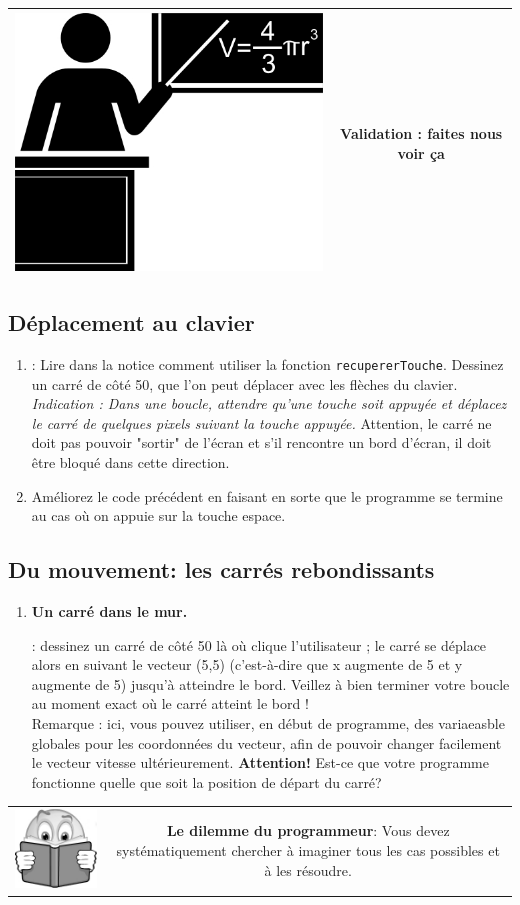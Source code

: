 \documentclass[11pt,a4paper]{article}
\newcommand{\checkbox}{$\square$ \smallskip}
\newenvironment{lecture}{%
\smallskip
\begin{tabular}{c|c}
    \hspace{.03\textwidth} \includegraphics[width=.07\textwidth]{img/lecture.jpg} & 
\begin{minipage}{.85\textwidth}
}{%
\end{minipage}
\end{tabular}
}
\newcounter{exo} \setcounter{exo}{0}
\newenvironment{action}{%
    \begin{enumerate}[\numerotation] \addtocounter{exo}{-1}%
        }{%
    \end{enumerate}
}
\newcommand{\numexoa}{\theexo \addtocounter{exo}{1}}
\newcommand{\numerotation}{\checkbox \smallskip \numexoa.}
\newenvironment{validation}{%
\smallskip
\begin{tabular}{c|c}
    \hspace{.03\textwidth} \includegraphics[width=.07\textwidth]{img/teacher.jpg} & 
\begin{minipage}{.85\textwidth}
}{%
\end{minipage}\\
\hline
\end{tabular}
}
\newcounter{exoo} \setcounter{exoo}{0}
\newcommand{\numexo}{\theexoo}
\newcommand{\repexo}{{\tt exo_\numexo}}
\newcommand{\exoplus}{\addtocounter{exoo}{1}}
\begin{document}
\begin{validation}
    Validation : faites nous voir ça 
\end{validation}
\bigskip

\subsection*{Déplacement au clavier}
\begin{action}
\item \exoplus \repexo : Lire dans la notice comment utiliser la fonction {\tt recupererTouche}. Dessinez un carré de côté 50, que l'on peut déplacer avec les flèches du clavier. \emph{Indication : Dans une boucle, attendre qu'une touche soit appuyée et déplacez le carré de quelques pixels suivant la touche appuyée.} Attention, le carré ne doit pas pouvoir "sortir" de l'écran et s'il rencontre un bord d'écran, il doit être bloqué dans cette direction.
\item Améliorez le code précédent en faisant en sorte que le programme se termine au cas où on appuie sur la touche espace.
\end{action}

\newpage
\subsection*{Du mouvement: les carrés rebondissants}
\begin{action}
\item {\bf Un carré dans le mur.} \exoplus \repexo : dessinez un carré de côté 50 là où clique l'utilisateur ; le carré se déplace alors en suivant le vecteur (5,5) (c'est-à-dire que x augmente de 5 et y augmente de 5) jusqu'à atteindre le bord. Veillez à bien terminer votre boucle au moment exact où le carré atteint le bord ! \\
Remarque : ici, vous pouvez utiliser, en début de programme, des variaeasble globales pour les coordonnées du vecteur, afin de pouvoir changer facilement le vecteur vitesse ultérieurement.
{\bf Attention!} Est-ce que votre programme fonctionne quelle que soit la position de départ du carré?
\end{action}

\begin{lecture}
{\bf Le dilemme du programmeur}: \og {\it monteriez-vous dans un avion piloté par un programme que vous avez écrit?} \fg  Vous devez systématiquement chercher à imaginer tous les cas possibles et à les résoudre.
\end{lecture}
\end{document}
